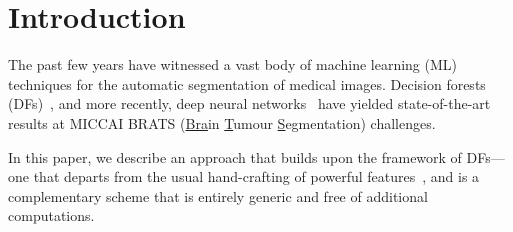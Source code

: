 
\section{Introduction}
\label{sec:intro}

The past few years have witnessed a vast body of machine learning (ML) techniques for 
the automatic segmentation of medical images. Decision forests (DFs)~\cite{zikic2012decision,tustison2013ants},
and more recently, deep neural networks~\cite{pereira2015deep} have yielded state-of-the-art results at 
MICCAI BRATS (\uline{Bra}in \uline{T}umour \uline{S}egmentation) challenges. 

In this paper, we describe an approach that builds upon the framework of DFs---one that departs from the usual 
hand-crafting of powerful features~\cite{cite-examples}, and is a complementary scheme that is entirely generic and 
free of additional computations.  
